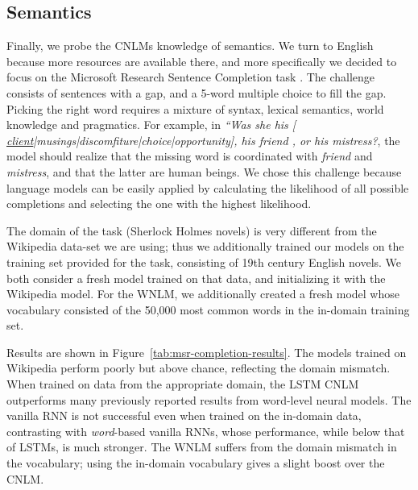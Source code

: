 

\subsection{Semantics}
\label{sec:semantics}

Finally, we probe the CNLMs knowledge of semantics. We turn to English
because more resources are available there, and more specifically we
decided to focus on the Microsoft Research Sentence Completion task
\cite{Zweig:Burges:2011}. The challenge consists of sentences with a
gap, and a 5-word multiple choice to fill the gap. Picking the right
word requires a mixture of syntax, lexical semantics, world knowledge
and pragmatics. For example, in \emph{``Was she his [
  \underline{client}|musings|discomfiture|choice|opportunity], his
  friend , or his mistress?}, the model should realize that the
missing word is coordinated with \emph{friend} and \emph{mistress},
and that the latter are human beings. We chose this challenge because
language models can be easily applied by calculating the likelihood of
all possible completions and selecting the one with the highest
likelihood.

The domain of the task (Sherlock Holmes novels) is very different from
the Wikipedia data-set we are using; thus we additionally trained our
models on the training set provided for the task, consisting of 19th
century English novels.  We both consider a fresh model trained on
that data, and initializing it with the Wikipedia model.
For the WNLM, we additionally created a fresh model whose vocabulary consisted
of the 50,000 most common words in the in-domain training set.

Results are shown in Figure~\ref{tab:msr-completion-results}.  The
models trained on Wikipedia perform poorly but above chance,
reflecting the domain mismatch.  When trained on data from the
appropriate domain, the LSTM CNLM outperforms many previously reported
results from word-level neural
models. %
The vanilla RNN is not successful even when trained on the in-domain
data, contrasting with \emph{word}-based vanilla RNNs, whose
performance, while below that of LSTMs, is much stronger.
The WNLM suffers from the domain mismatch in the vocabulary; using the in-domain vocabulary gives a slight boost over the CNLM.

